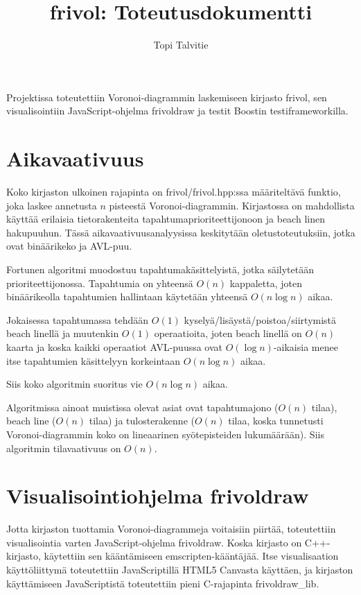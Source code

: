\documentclass[a4paper, 11pt, finnish]{article}
\author{Topi Talvitie}
\title{frivol: Toteutusdokumentti}
\begin{document}
\maketitle

Projektissa toteutettiin Voronoi-diagrammin laskemiseen kirjasto frivol, sen visualisointiin JavaScript-ohjelma frivoldraw ja testit Boostin testiframeworkilla.

\section*{Aikavaativuus}
Koko kirjaston ulkoinen rajapinta on frivol/frivol.hpp:ssa määriteltävä funktio, joka laskee annetusta $n$ pisteestä Voronoi-diagrammin. Kirjastossa on mahdollista käyttää erilaisia tietorakenteita tapahtumaprioriteettijonoon ja beach linen hakupuuhun. Tässä aikavaativuusanalyysissa keskitytään oletustoteutuksiin, jotka ovat binäärikeko ja AVL-puu.

Fortunen algoritmi muodostuu tapahtumakäsittelyistä, jotka säilytetään prioriteettijonossa. Tapahtumia on yhteensä $O(n)$ kappaletta, joten binäärikeolla tapahtumien hallintaan käytetään yhteensä $O(n\log n)$ aikaa.

Jokaisessa tapahtumassa tehdään $O(1)$ kyselyä/lisäystä/poistoa/siirtymistä beach linellä ja muutenkin $O(1)$ operaatioita, joten beach linellä on $O(n)$ kaarta ja koska kaikki operaatiot AVL-puussa ovat $O(\log n)$-aikaisia menee itse tapahtumien käsittelyyn korkeintaan $O(n\log n)$ aikaa.

Siis koko algoritmin suoritus vie $O(n\log n)$ aikaa.

Algoritmissa ainoat muistissa olevat asiat ovat tapahtumajono ($O(n)$ tilaa), beach line ($O(n)$ tilaa) ja tulosterakenne ($O(n)$ tilaa, koska tunnetusti Voronoi-diagrammin koko on lineaarinen syötepisteiden lukumäärään). Siis algoritmin tilavaativuus on $O(n)$.

\section*{Visualisointiohjelma frivoldraw}
Jotta kirjaston tuottamia Voronoi-diagrammeja voitaisiin piirtää, toteutettiin visualisointia varten JavaScript-ohjelma frivoldraw. Koska kirjasto on C++-kirjasto, käytettiin sen kääntämiseen emscripten-kääntäjää. Itse visualisaation käyttöliittymä toteutettiin JavaScriptillä HTML5 Canvasta käyttäen, ja kirjaston käyttämiseen JavaScriptistä toteutettiin pieni C-rajapinta frivoldraw\_lib.
\end{document}
